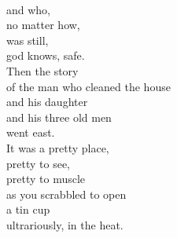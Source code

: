 \documentclass[smalldemyvopaper,11pt,twoside,onecolumn,openright,extrafontsizes]{memoir}
\begin{document}
\\and who,
\\no matter how,
\\was still,
\\god knows, safe.
\\Then the story
\\of the man who cleaned the house
\\and his daughter
\\and his three old men
\\went east.
\\It was a pretty place,
\\pretty to see,
\\pretty to muscle
\\as you scrabbled to open
\\a tin cup
\\ultrariously, in the heat.
\end{document}
